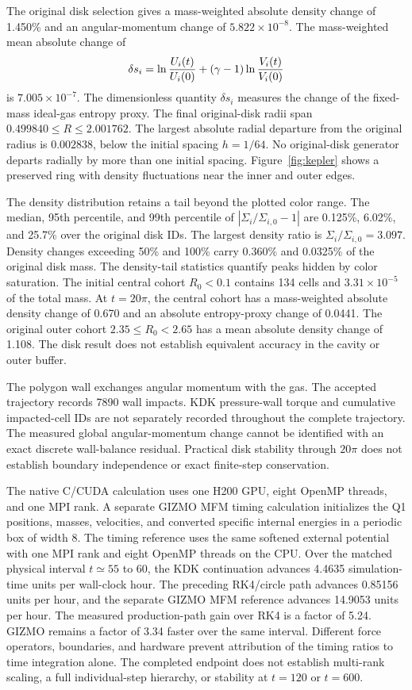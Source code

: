 \documentclass[twocolumn]{aastex63}
\begin{document}
The original disk selection gives a mass-weighted absolute density change
of 1.450\% and an angular-momentum change of $5.822\times10^{-8}$.
The mass-weighted mean absolute change of
\begin{equation}
  \delta s_i=\ln{U_i(t)\over U_i(0)}
          +(\gamma-1)\ln{V_i(t)\over V_i(0)}
  \label{eq:kepler_entropy_proxy}
\end{equation}
is $7.005\times10^{-7}$. The dimensionless quantity $\delta s_i$ measures
the change of the fixed-mass ideal-gas entropy proxy. The final original-disk
radii span $0.499840\le R\le2.001762$. The largest absolute radial departure
from the original radius is $0.002838$, below the initial spacing $h=1/64$.
No original-disk generator departs radially by more than one initial spacing.
Figure~\ref{fig:kepler} shows a preserved ring with density fluctuations
near the inner and outer edges.

The density distribution retains a tail beyond the plotted color range.
The median, 95th percentile, and 99th percentile of
$|\Sigma_i/\Sigma_{i,0}-1|$ are 0.125\%, 6.02\%, and 25.7\% over the
original disk IDs. The largest density ratio is
$\Sigma_i/\Sigma_{i,0}=3.097$. Density changes exceeding 50\% and 100\%
carry 0.360\% and 0.0325\% of the original disk mass.
The density-tail statistics quantify peaks hidden by color saturation.
The initial central cohort $R_0<0.1$ contains 134 cells and
$3.31\times10^{-5}$ of the total mass. At $t=20\pi$, the central cohort
has a mass-weighted absolute density change of 0.670 and an absolute
entropy-proxy change of 0.0441. The original outer cohort
$2.35\le R_0<2.65$ has a mean absolute density change of 1.108.
The disk result does not establish equivalent accuracy in the cavity
or outer buffer.

The polygon wall exchanges angular momentum with the gas.
The accepted trajectory records 7890 wall impacts. KDK pressure-wall
torque and cumulative impacted-cell IDs are not separately recorded
throughout the complete trajectory. The measured global angular-momentum
change cannot be identified with an exact discrete wall-balance residual.
Practical disk stability through $20\pi$ does not establish boundary
independence or exact finite-step conservation.

The native C/CUDA calculation uses one H200 GPU, eight OpenMP threads,
and one MPI rank. A separate GIZMO MFM timing calculation initializes
the Q1 positions, masses, velocities, and converted specific internal
energies in a periodic box of width 8. The timing reference uses the
same softened external potential with one MPI rank and eight OpenMP
threads on the CPU. Over the matched physical interval $t\simeq55$ to 60,
the KDK continuation advances 4.4635 simulation-time units per wall-clock
hour. The preceding RK4/circle path advances 0.85156 units per hour,
and the separate GIZMO MFM reference advances 14.9053 units per hour.
The measured production-path gain over RK4 is a factor of 5.24.
GIZMO remains a factor of 3.34 faster over the same interval.
Different force operators, boundaries, and hardware prevent attribution
of the timing ratios to time integration alone. The completed endpoint
does not establish multi-rank scaling, a full individual-step hierarchy,
or stability at $t=120$ or $t=600$.
\end{document}
